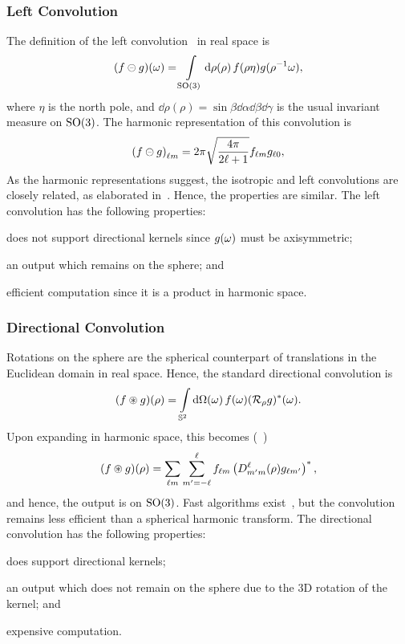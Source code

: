 \subsubsection{Left Convolution}

The definition of the left convolution~\cite{Kennedy2011,Driscoll1994} in real space is
%
\begin{equation}
	(f \circleddash g)(\omega) = \int\limits_{\text{SO(3)}} \dd{\rho(\rho)} f(\rho\eta) g(\rho^{-1}\omega),
\end{equation}
%
where \({\eta}\) is the north pole, and \(\dd{\rho(\rho)}=\sin{\beta} \dd{\alpha} \dd{\beta} \dd{\gamma}\) is the usual invariant measure on \(\text{SO(3)}{}\).
The harmonic representation of this convolution is
%
\begin{equation}
	{(f \circleddash g)}_{\ell m} = 2\pi \sqrt{\frac{4\pi}{2\ell+1}} {f}_{\ell m} {g}_{\ell 0},
\end{equation}
%
As the harmonic representations suggest, the isotropic and left convolutions are closely related, as elaborated in~\cite{Kennedy2011}.
Hence, the properties are similar.
The left convolution has the following properties:
%
\begin{inparaenum}[(i)]
	\item does not support directional kernels since \(g(\omega)\) must be axisymmetric;
	\item an output which remains on the sphere; and
	\item efficient computation since it is a product in harmonic space.
\end{inparaenum}

\subsubsection{Directional Convolution}

Rotations on the sphere are the spherical counterpart of translations in the Euclidean domain in real space.
Hence, the standard directional convolution is
%
\begin{equation}\label{eq:chapter2_directional_convolution}
	(f \circledast g)(\rho) = \int\limits_{\mathbb{S}^{2}} \dd{\Omega(\omega)} f(\omega) (\mathcal{R}_{\rho}g)^{\ast}(\omega).
\end{equation}
%
Upon expanding in harmonic space, this becomes (\eg{}~\cite{McEwen2007,Wandelt2001})
%
\begin{equation}
	(f \circledast g) (\rho) = \sum\limits_{\ell m} \sum\limits_{m'=-\ell}^{\ell} {f}_{\ell m} \left( D^{\ell}_{m'm}(\rho) g_{\ell m'} \right)^{\ast},
\end{equation}
%
and hence, the output is on \(\text{SO(3)}{}\).
Fast algorithms exist~\cite{McEwen2007,Wandelt2001,Wiaux2007,McEwen2013}, but the convolution remains less efficient than a spherical harmonic transform.
The directional convolution has the following properties:
%
\begin{inparaenum}[(i)]
	\item does support directional kernels;
	\item an output which does not remain on the sphere due to the 3D rotation of the kernel; and
	\item expensive computation.
\end{inparaenum}

